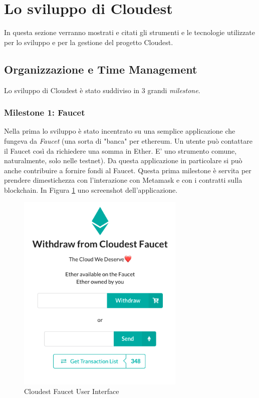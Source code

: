 \documentclass{article}
\begin{document}
\newpage
\section{Lo sviluppo di Cloudest}
In questa sezione verranno mostrati e citati gli strumenti e le tecnologie utilizzate per lo sviluppo e per la gestione del progetto Cloudest.

\subsection{Organizzazione e Time Management}
Lo sviluppo di Cloudest è stato suddiviso in 3 grandi \textit{milestone}. 
\subsubsection{Milestone 1: Faucet}
Nella prima lo sviluppo è stato incentrato su una semplice applicazione che fungeva da \textit{Faucet} (una sorta di "banca" per ethereum. Un utente può contattare il Faucet così da richiedere una somma in Ether. E' uno strumento comune, naturalmente, solo nelle testnet). Da questa applicazione in particolare si può anche contribuire a fornire fondi al Faucet. Questa prima milestone è servita per prendere dimestichezza con l'interazione con Metamask e con i contratti sulla blockchain. In Figura \ref{fig:faucet} uno screenshot dell'applicazione.
\begin{figure}[!ht]
  \includegraphics[width=8cm]{images/faucet.png}
  \centering
  \caption{Cloudest Faucet User Interface}
  \label{fig:faucet}
\end{figure}
\end{document}
